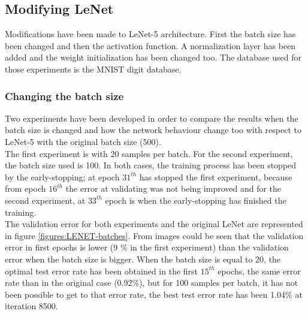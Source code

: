 \subsection{Modifying LeNet}
Modifications have been made to LeNet-5 architecture. First the batch size has been changed and then the activation function. A normalization layer has been added and the weight initialization has been changed too. The database used for those experiments is the MNIST digit database.\\

\subsubsection{Changing the batch size}
Two experiments have been developed in order to compare the results when the batch size is changed and how the network behaviour change too with respect to LeNet-5 with the original batch size (500).\\

The first experiment is with 20 samples per batch. For the second experiment, the batch size used is 100. In both cases, the training process has been stopped by the early-stopping; at epoch $31^{th}$ has stopped the first experiment, because from epoch $16^{th}$ the error at validating was not being improved and for the second experiment, at $33^{th}$ epoch is when the early-stopping has finished the training.\\

The validation error for both experiments and the original LeNet are represented in figure \ref{figures:LENET-batches}. From images could be seen that the validation error in first epochs is lower (9 \% in the first experiment) than the validation error when the batch size is bigger. When the batch size is equal to 20, the optimal test error rate has been obtained in the first $15^{th}$ epochs, the same error rate than in the original case (0.92\%), but for 100 samples per batch, it has not been possible to get to that error rate, the best test error rate has been 1.04\% at iteration 8500.\\

